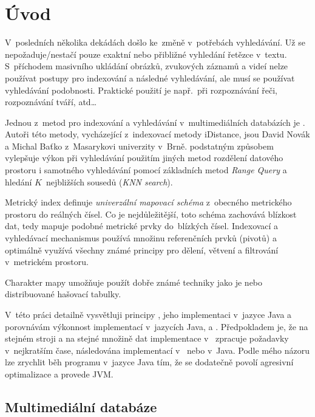 \chapter{Úvod}

V~posledních několika dekádách došlo ke~změně v~potřebách vyhledávání.
Už se nepožaduje/nestačí pouze exaktní nebo přibližné vyhledání řetězce v~textu.
S~příchodem masivního ukládání obrázků, zvukových záznamů a videí nelze používat  postupy pro indexování a následné vyhledávání, ale musí se používat vyhledávání podobnosti.
Praktické použití je např.~při rozpoznávání řeči, rozpoznávání tváří, atd\ldots{}

Jednou z~metod pro indexování a vyhledávání v~multimediálních databázích je \MIndex{}\cite{Novak:2009:MIE:1637863.1638184}.
Autoři této metody, vycházející z~indexovací metody iDistance\cite{Jagadish:2005:IAB:1071610.1071612}, jsou David Novák a Michal Baťko z~Masarykovi univerzity v~Brně.
\MIndex{} podstatným způsobem vylepšuje výkon při vyhledávání použitím jiných metod rozdělení datového prostoru i samotného vyhledávání pomocí základních metod \emph{Range Query} a hledání $K$~nejbližších sousedů (\emph{KNN search})\@.

Metrický index definuje \emph{univerzální mapovací schéma} z~obecného metrického prostoru do reálných čísel.
Co je nejdůležitější, toto schéma zachovává blízkost dat, tedy mapuje podobné metrické prvky do~blízkých čísel.
Indexovací a vyhledávací mechanismus  používá množinu referenčních prvků (pivotů) a optimálně využívá všechny známé principy pro dělení, větvení a filtrování v~metrickém prostoru.

Charakter mapy  umožňuje použít dobře známé techniky jako je \BPTree\cite{Cormen:2001:IA:580470} nebo distribuované hašovací tabulky.

V~této práci detailně vysvětluji principy , jeho implementaci v~jazyce Java a porovnávám výkonnost implementací  v~jazycích
Java, \CC{} a \CS{}.
Předpokladem je, že na stejném stroji a na stejné množině dat implementace v~\CC{} zpracuje požadavky v~nejkratším čase, následována implementací v~\CS{} nebo v~Java.
Podle mého názoru lze zrychlit běh programu v~jazyce Java tím, že se dodatečně povolí agresivní optimalizace a provede  JVM.

\section{Multimediální databáze}

